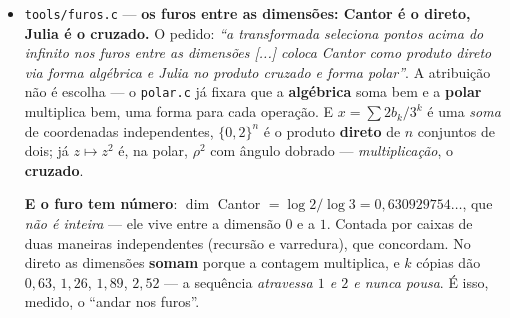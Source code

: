 \documentclass[11pt]{article}
\newcommand{\code}[1]{\texttt{\small #1}}
\newcommand{\R}{\mathbb R}
\theoremstyle{plain}
\theoremstyle{remark}
\begin{document}
\begin{itemize}
\textbf{$z\to z^2$ é o deslocamento.} Para $c=0$ o conjunto de Julia é o círculo unitário e a
dinâmica dobra o ângulo --- e dobrar o ângulo, em binário, é \emph{comer o primeiro bit}. É este o
passo do ribossomo, medido contra o deslocamento feito nos bits como oráculo independente: $1758$
passos, zero divergências. \emph{É por isso que a fita ``estica conforme ele anda''}: cada iteração
consome uma camada do enrolamento e expõe a seguinte --- o enrolamento não se desfaz por fora, é a
própria dinâmica que o estica.

\textbf{Newton reparte nas dimensões.} Sobre $z^n-1$ o método atribui cada ponto a uma das $n$
raízes, e as $n$ raízes são as $n$ dimensões: a bacia de atração \emph{é} o codão que diz qual. Todas
ocupadas para $n=2\dots6$ --- nenhuma dimensão fica sem quem a codifique. É a instância final, onde a
fita deixa de ser sequência e passa a ser coordenada.

\emph{E o §Y5 tinha duas asserções vazias minhas --- e, pior, uma afirmação invertida.} escrevera
que ``nenhuma metade sozinha basta'', e é o oposto: no DNA cada fita \textbf{determina} a outra, e é
exatamente por isso que a replicação funciona. O que a reversibilidade exige não é que as metades se
guardem uma à outra --- é que a regra que as separa seja a sua \textbf{própria inversa}. Mede-se
agora a involução, com uma regra que roda em vez de trocar a servir de controlo. É o mesmo movimento
que a teoria faz com $\R^n$ e $\R^{n*}$: o dual obtém-se trocando o sinal de uma peça, e trocar duas
vezes devolve.

\item \code{tools/furos.c} --- \textbf{os furos entre as dimensões: Cantor é o direto, Julia é o
cruzado.} O pedido: \emph{``a transformada seleciona pontos acima do infinito nos furos entre as
dimensões [...] coloca Cantor como produto direto via forma algébrica e Julia no produto cruzado e
forma polar''}. A atribuição não é escolha --- o \code{polar.c} já fixara que a \textbf{algébrica}
soma bem e a \textbf{polar} multiplica bem, uma forma para cada operação. E $x=\sum 2b_k/3^k$ é uma
\emph{soma} de coordenadas independentes, $\{0,2\}^n$ é o produto \textbf{direto} de $n$ conjuntos de
dois; já $z\mapsto z^2$ é, na polar, $\rho^2$ com ângulo dobrado --- \emph{multiplicação}, o
\textbf{cruzado}.

\textbf{E o furo tem número}: $\dim$ Cantor $=\log2/\log3=0{,}630929754\ldots$, que \emph{não é
inteira} --- ele vive entre a dimensão $0$ e a $1$. Contada por caixas de duas maneiras independentes
(recursão e varredura), que concordam. No direto as dimensões \textbf{somam} porque a contagem
multiplica, e $k$ cópias dão $0{,}63$, $1{,}26$, $1{,}89$, $2{,}52$ --- a sequência \emph{atravessa
$1$ e $2$ e nunca pousa}. É isso, medido, o ``andar nos furos''.


\end{itemize}
\end{document}
